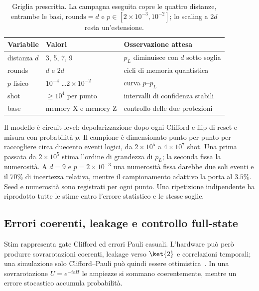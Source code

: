 \begin{onehalfspace}
\begin{table}[H]
\centering
\begin{tabularx}{\textwidth}{llX}
\toprule
\textbf{Variabile} & \textbf{Valori} & \textbf{Osservazione attesa} \\
\midrule
distanza $d$ & 3, 5, 7, 9 & $p_L$ diminuisce con $d$ sotto soglia \\
rounds & $d$ e $2d$ & cicli di memoria quantistica \\
$p$ fisico & $10^{-4}$ \dots $2\times10^{-2}$ & curva $p$--$p_L$ \\
shot & $\geq10^4$ per punto & intervalli di confidenza stabili \\
base & memory X e memory Z & controllo delle due protezioni \\
\bottomrule
\end{tabularx}
\caption[Disegno sperimentale surface code]{Griglia prescritta. La
campagna eseguita copre le quattro distanze, entrambe le basi,
$\mathrm{rounds}=d$ e $p\in[2\times10^{-3},10^{-2}]$; lo scaling a
$2d$ resta un'estensione.}
\label{tab:surface_esperimento}
\end{table}

Il modello è circuit-level: depolarizzazione dopo ogni Clifford e flip di
reset e misura con probabilità $p$. Il campione è dimensionato punto per
punto per raccogliere circa duecento eventi logici, da $2\times10^5$ a
$4\times10^7$ shot. Una prima passata da $2\times10^5$ stima l'ordine di
grandezza di $p_L$; la seconda fissa la numerosità. A $d=9$ e
$p=2\times10^{-3}$ una numerosità fissa darebbe due soli eventi e il
$70\%$ di incertezza relativa, mentre il campionamento adattivo la porta
al $3.5\%$. Seed e numerosità sono registrati per ogni punto. Una
ripetizione indipendente ha riprodotto tutte le stime entro l'errore
statistico e le stesse soglie.

\subsection{Errori coerenti, leakage e controllo full-state}
\label{app:surface_non_pauli}

Stim rappresenta gate Clifford ed errori Pauli casuali. L'hardware può
però produrre sovrarotazioni coerenti, leakage verso $\ket{2}$ e
correlazioni temporali; una simulazione solo Clifford--Pauli può quindi
essere ottimistica~\cite{plaquette2026}. In una sovrarotazione
$U=e^{-i\varepsilon H}$ le ampiezze si sommano coerentemente, mentre un
errore stocastico accumula probabilità.


\end{onehalfspace}
